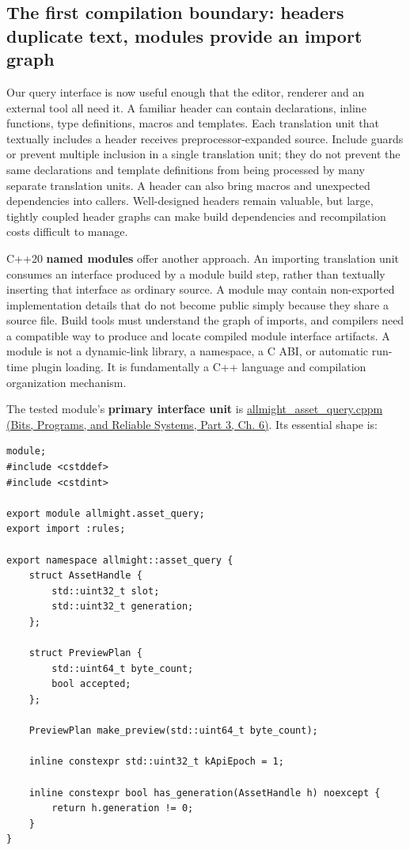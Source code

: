 \subsection{The first compilation boundary: headers duplicate text, modules provide an import graph}\label{05-engine-i-ch006-the-first-compilation-boundary-headers-duplicate-text-modules-provide-an-import-graph}

\hypertarget{05-engine-i-ch006-the-first-compilation-boundary-headers-duplicate-text-modules-provide-an-import-graph}{}

Our query interface is now useful enough that the editor, renderer and an external tool all need it. A familiar header can contain declarations, inline functions, type definitions, macros and templates. Each translation unit that textually includes a header receives preprocessor-expanded source. Include guards or  prevent multiple inclusion in a single translation unit; they do not prevent the same declarations and template definitions from being processed by many separate translation units. A header can also bring macros and unexpected dependencies into callers. Well-designed headers remain valuable, but large, tightly coupled header graphs can make build dependencies and recompilation costs difficult to manage.

C++20 \textbf{named modules} offer another approach. An importing translation unit consumes an interface produced by a module build step, rather than textually inserting that interface as ordinary source. A module may contain non-exported implementation details that do not become public simply because they share a source file. Build tools must understand the graph of imports, and compilers need a compatible way to produce and locate compiled module interface artifacts. A module is not a dynamic-link library, a namespace, a C ABI, or automatic run-time plugin loading. It is fundamentally a C++ language and compilation organization mechanism.

The tested module's \textbf{primary interface unit} is \href{../01-Bits-Programs-and-Reliable-Systems-P03/main.pdf\#source-file-453ba365bb56ed2f6e4c3f8e}{allmight\_asset\_query.cppm (Bits, Programs, and Reliable Systems, Part 3, Ch. 6)}. Its essential shape is:

\begin{verbatim}
module;
#include <cstddef>
#include <cstdint>

export module allmight.asset_query;
export import :rules;

export namespace allmight::asset_query {
    struct AssetHandle {
        std::uint32_t slot;
        std::uint32_t generation;
    };

    struct PreviewPlan {
        std::uint64_t byte_count;
        bool accepted;
    };

    PreviewPlan make_preview(std::uint64_t byte_count);

    inline constexpr std::uint32_t kApiEpoch = 1;

    inline constexpr bool has_generation(AssetHandle h) noexcept {
        return h.generation != 0;
    }
}
\end{verbatim}


